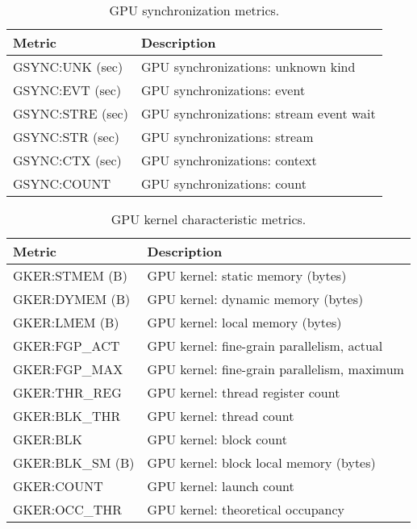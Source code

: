 \begin{table}[h]
\centering
\begin{tabular}{|l|l|}\hline
Metric & Description\\\hline\hline
 GSYNC:UNK (sec)  &  GPU synchronizations: unknown kind  \\\hline 
  GSYNC:EVT (sec)  &  GPU synchronizations: event  \\\hline 
  GSYNC:STRE (sec)  &  GPU synchronizations: stream event wait  \\\hline 
  GSYNC:STR (sec)  &  GPU synchronizations: stream  \\\hline 
  GSYNC:CTX (sec)  &  GPU synchronizations: context  \\\hline 
  GSYNC:COUNT  &  GPU synchronizations: count  \\\hline 
\end{tabular}
\caption{GPU synchronization metrics.}
\label{table:gsync}
\end{table}


\begin{table}[h]
\centering
\begin{tabular}{|l|l|}\hline
Metric & Description\\\hline\hline
GKER:STMEM (B) & GPU kernel: static memory (bytes)    \\\hline
GKER:DYMEM (B) & GPU kernel: dynamic memory (bytes)   \\\hline
GKER:LMEM (B) & GPU kernel: local memory (bytes)    \\\hline
GKER:FGP\_ACT & GPU kernel: fine-grain parallelism, actual    \\\hline
GKER:FGP\_MAX & GPU kernel: fine-grain parallelism, maximum    \\\hline
GKER:THR\_REG & GPU kernel: thread register count    \\\hline
GKER:BLK\_THR & GPU kernel: thread count   \\\hline
GKER:BLK  & GPU kernel: block count   \\\hline
GKER:BLK\_SM (B) & GPU kernel: block local memory (bytes)   \\\hline
GKER:COUNT & GPU kernel: launch count   \\\hline
GKER:OCC\_THR & GPU kernel: theoretical occupancy    \\\hline
\end{tabular}
\caption{GPU kernel characteristic metrics.}
\label{table:gker}
\end{table}

